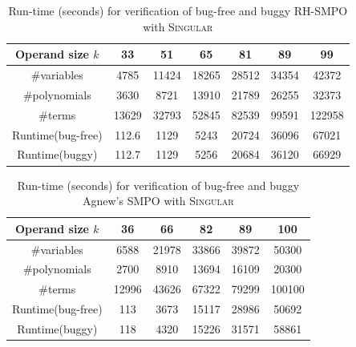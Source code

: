 \begin{table}[htb]
\centering
\caption{\small Run-time (seconds) for verification of bug-free and
  buggy RH-SMPO with \textsc{Singular}} 
\label{tbl:exp1}  
\begin{tabular}{|c||c|c|c|c|c|c|} 
\hline
Operand size $k$ & 33 & 51 & 65 & 81 & 89 & 99\\
\hline
\#variables & 4785 & 11424 & 18265 & 28512 & 34354 & 42372\\
\hline
\#polynomials & 3630 & 8721 & 13910 & 21789 & 26255 & 32373\\
\hline
\#terms & 13629 & 32793 & 52845 & 82539 & 99591 & 122958\\
\hline
\hline
Runtime(bug-free) & 112.6 & 1129 & 5243 & 20724 & 36096 & 67021\\
\hline
Runtime(buggy) & 112.7 & 1129 & 5256 & 20684 & 36120 & 66929\\
\hline
\end{tabular}
\end{table}

\begin{table}[hbt]
\centering
\caption{\small Run-time (seconds) for verification of
  bug-free and buggy Agnew's SMPO with \textsc{Singular}}
\label{tbl:exp2}
\begin{tabular}{|c||c|c|c|c|c|} 
\hline
Operand size $k$ & 36 & 66 & 82 & 89 & 100 \\
\hline
\#variables & 6588 & 21978 & 33866 & 39872 & 50300\\
\hline
\#polynomials & 2700 & 8910 & 13694 & 16109 & 20300\\
\hline
\#terms & 12996 & 43626 & 67322 & 79299 & 100100 \\
\hline
\hline
Runtime(bug-free) & 113 & 3673 & 15117 & 28986 & 50692 \\
\hline
Runtime(buggy) & 118 & 4320 & 15226 & 31571 & 58861\\
\hline
\end{tabular}
\end{table}

